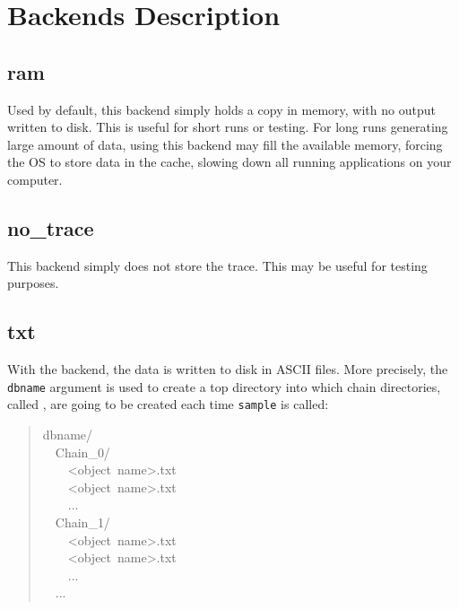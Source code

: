
\hypertarget{backends-description}{}
\section*{Backends Description}
\label{backends-description}



\hypertarget{ram}{}
\subsection*{ram}
\label{ram}

Used by default, this backend simply holds a copy in memory, with no output
written to disk. This is useful for short runs or testing. For long runs
generating large amount of data, using this backend may fill the available
memory, forcing the OS to store data in the cache, slowing down all running
applications on your computer.



\hypertarget{no-trace}{}
\subsection*{no{\_}trace}
\label{no-trace}

This backend simply does not store the trace. This may be useful for testing
purposes.



\hypertarget{txt}{}
\subsection*{txt}
\label{txt}

With the  backend, the data is written to disk in ASCII files.
More precisely, the \texttt{dbname} argument is used to create a top directory
into which chain directories, called , are going to be created each
time \texttt{sample} is called:
\begin{quote}{\ttfamily \raggedright \noindent
dbname/~\\
~~Chain{\_}0/~\\
~~~~<object~name>.txt~\\
~~~~<object~name>.txt~\\
~~~~...~\\
~~Chain{\_}1/~\\
~~~~<object~name>.txt~\\
~~~~<object~name>.txt~\\
~~~~...~\\
~~...
}\end{quote}

